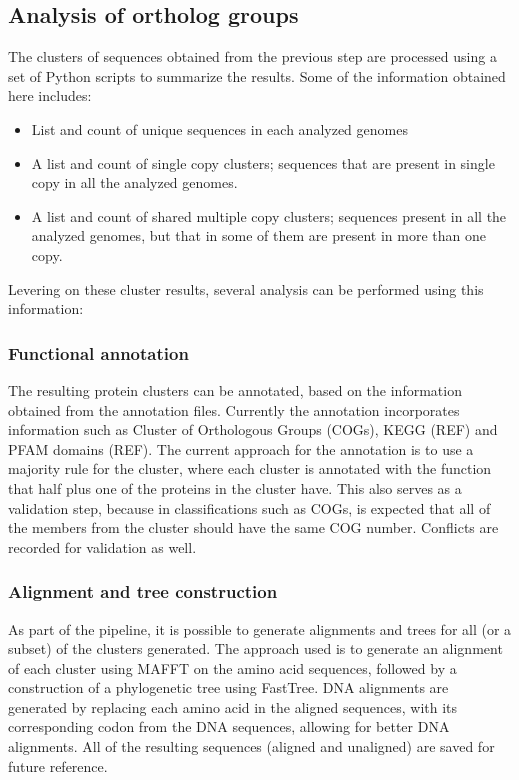 \subsection{Analysis of ortholog groups}

The clusters of sequences obtained from the previous step are processed using a set of Python scripts to summarize the results. Some of the information obtained here includes:

\begin{itemize}
\item List and count of unique sequences in each analyzed genomes
\item A list and count of single copy clusters; sequences that are present in single copy in all the analyzed genomes. 
\item A list and count of shared multiple copy clusters; sequences present in all the analyzed genomes, but that in some of them are present in more than one copy.
\end{itemize} 

Levering on these cluster results, several analysis can be performed using this information:

\subsubsection{Functional annotation}

The resulting protein clusters can be annotated, based on the information obtained from the annotation files. Currently the annotation incorporates information such as Cluster of Orthologous Groups (COGs), KEGG (REF) and PFAM domains (REF). The current approach for the annotation is to use a majority rule for the cluster, where each cluster is annotated with the function that half plus one of the proteins in the cluster have. This also serves as a validation step, because in classifications such as COGs, is expected that all of the members from the cluster should have the same COG number. Conflicts are recorded for validation as well.

\subsubsection{Alignment and tree construction}

As part of the pipeline, it is possible to generate alignments and trees for all (or a subset) of the clusters generated. The approach used is to generate an alignment of each cluster using MAFFT on the amino acid sequences, followed by a construction of a phylogenetic tree using FastTree. DNA alignments are generated by replacing each amino acid in the aligned sequences, with its corresponding codon from the DNA sequences, allowing for better DNA alignments. All of the resulting sequences (aligned and unaligned) are saved for future reference.

